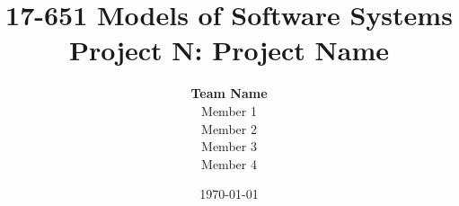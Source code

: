 \documentclass[titlepage]{article}
\begin{document}
\title{17-651 Models of Software Systems\\[1ex] Project N: Project Name}
\author{
{\Large\textbf{Team Name}}\\[3ex]
Member 1\\[1ex] Member 2\\[1ex] Member 3\\[1ex] Member 4}
\date{\today}
\maketitle
\end{document}
